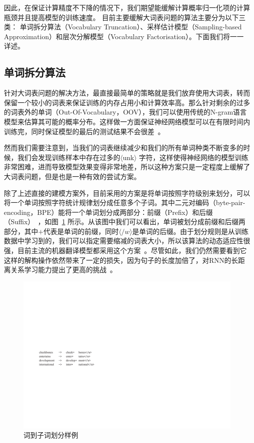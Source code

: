 
因此，在保证计算精度不下降的情况下，我们期望能缓解计算概率归一化项的计算瓶颈并且提高模型的训练速度。 目前主要缓解大词表问题的算法主要分为以下三类： 单词拆分算法（Vocabulary Truncation）、采样估计模型（Sampling-based Approximation）和层次分解模型（Vocabulary Factorisation）。下面我们将一一详述。


\subsection{单词拆分算法}
针对大词表问题的解决方法，最直接最简单的策略就是我们放弃使用大词表，转而保留一个较小的词表来保证训练的内存占用小和计算效率高。那么针对剩余的过多的词表外的单词（Out-Of-Vocabulary，OOV），我们可以使用传统的N-gram语言模型来估算其可能的概率分布。这样做一方面保证神经网络模型可以在有限时间内训练完，同时保证模型的最后的测试结果不会很差~。

然而我们需要注意到，当我们的词表继续减少和我们的所有单词种类不断变多的时候，我们会发现训练样本中存在过多的$\langle$unk$\rangle$ 字符，这样使得神经网络的模型训练非常困难，进而导致模型效果变得非常地差，所以这种方案只是一定程度上缓解了大词表问题，但是也是一种有效的尝试方案。

除了上述直接的建模方案外，目前采用的方案是将单词按照字符级别来划分，可以将一个单词按照字符统计规律划分成任意多个子词。其中二元对编码（byte-pair-encoding，BPE）能将一个单词划分成两部分：前缀（Prefix）和后缀（Suffix）~，如图~\ref{fig:subword} 所示。从该图中我们可以看出，单词被划分成前缀和后缀两部分，其中$+$代表是单词的前缀，同时$\langle /w \rangle$是单词的后缀。由于划分规则是从训练数据中学习到的，我们可以指定需要缩减的词表大小，所以该算法的动态适应性很强，目前主流的机器翻译模型都采用这个方案~。尽管如此，我们仍然需要看到它这样的解构操作依然带来了一定的损失，因为句子的长度加倍了，对RNN的长距离关系学习能力提出了更高的挑战~。

\begin{figure}[!h]
  \centering
\includegraphics[width=0.6\linewidth]{./figures/subword.pdf}
\caption{词到子词划分样例}\label{fig:subword}
\end{figure}

